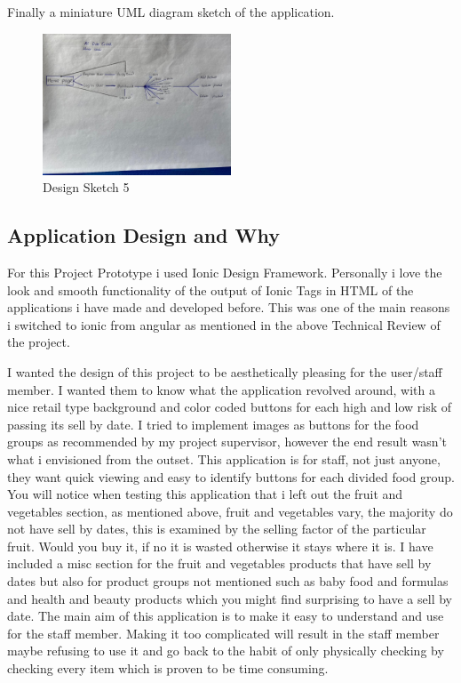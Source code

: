 Finally a miniature UML diagram sketch of the application. 

\begin{figure}[h!]
	\caption{Design Sketch 5}
	\label{image:sketch5}
	\centering
	\includegraphics[width=0.5\textwidth]{images/sketch5.jpg}
\end{figure}
\newpage

\subsection{Application Design and Why}
For this Project Prototype i used Ionic Design Framework. Personally i love the look and smooth functionality of the output of Ionic Tags in HTML of the applications i have made and developed before. This was one of the main reasons i switched to ionic from angular as mentioned in the above Technical Review of the project. 
\newline

I wanted the design of this project to be aesthetically pleasing for the user/staff member. I wanted them to know what the application revolved around, with a nice retail type background and color coded buttons for each high and low risk of passing its sell by date. I tried to implement images as buttons for the food groups as recommended by my project supervisor, however the end result wasn't what i envisioned from the outset. This application is for staff, not just anyone, they want quick viewing and easy to identify buttons for each divided food group. You will notice when testing this application that i left out the fruit and vegetables section, as mentioned above, fruit and vegetables vary, the majority do not have sell by dates, this is examined by the selling factor of the particular fruit. Would you buy it, if no it is wasted otherwise it stays where it is. I have included a misc section for the fruit and vegetables products that have sell by dates but also for product groups not mentioned such as baby food and formulas and health and beauty products which you might find surprising to have a sell by date. The main aim of this application is to make it easy to understand and use for the staff member. Making it too complicated will result in the staff member maybe refusing to use it and go back to the habit of only physically checking by checking every item which is proven to be time consuming.
\newline

